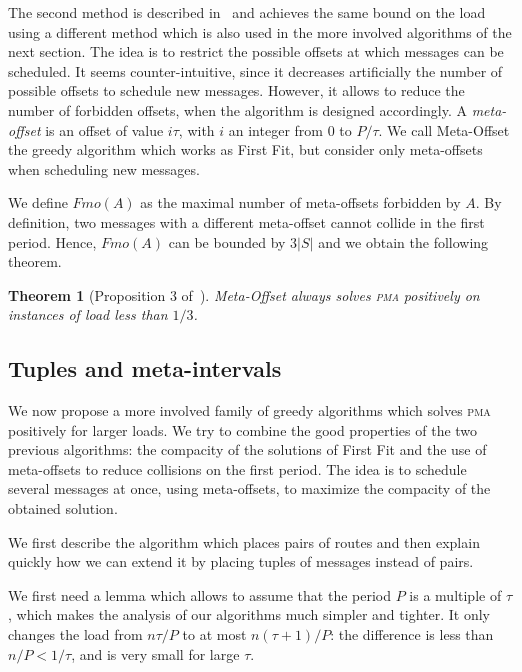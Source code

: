 \documentclass[10pt, conference, letterpaper]{IEEEtran}
\newtheorem{theorem}{Theorem}
\newcommand\pma{\textsc{pma}\xspace}
\begin{document}
The second method is described  in~\cite{barth2018deterministic} and achieves the same bound on the load using a different method which is also used in the more involved algorithms
of the next section.
The idea is to restrict the possible offsets at which messages can be scheduled. It seems counter-intuitive, since it decreases artificially the number of possible offsets to schedule new messages. However, it allows to reduce the number of forbidden offsets, when the algorithm is designed accordingly. A \emph{meta-offset} is an offset of value $i\tau$,
with $i$ an integer from $0$ to $P / \tau$. We call Meta-Offset the greedy algorithm
which works as First Fit, but consider only meta-offsets when scheduling new messages. 

We define $Fmo(A)$ as the maximal number of meta-offsets forbidden by $A$. 
 By definition, two messages with a different meta-offset cannot collide in the first period.
Hence, $Fmo(A)$ can be bounded by $3|S|$ and we obtain the following theorem.


\begin{theorem}[Proposition 3 of~\cite{barth2018deterministic}]
Meta-Offset always solves \pma positively on instances of load less than
$1/3$.
\end{theorem}

\subsection{Tuples and meta-intervals}

We now propose a more involved family of greedy algorithms which 
solves \pma positively for larger loads. We try to combine the good properties of the two previous algorithms: the compacity of the solutions of First Fit and the use of meta-offsets to reduce collisions on the first period. The idea is to schedule several messages at once, using meta-offsets, to maximize the compacity of the obtained solution. 

We first describe the algorithm which places pairs of routes and then explain quickly how we can extend it by placing tuples of messages instead of pairs.

We first need a lemma which allows to assume that the period $P$ is a multiple of $\tau$, 
which makes the analysis of our algorithms much simpler and tighter. It only changes the load
from $n \tau / P$ to at most $n (\tau +1)/ P$: the difference is less than $n /P < 1/\tau$,
and is very small for large $\tau$.
\end{document}
